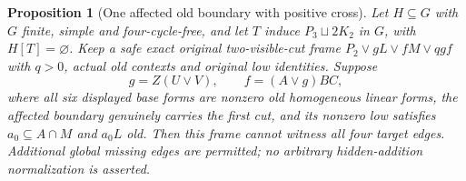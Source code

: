 \documentclass[11pt]{article}
\newtheorem{proposition}[theorem]{Proposition}
\theoremstyle{definition}
\theoremstyle{remark}
\begin{document}
\begin{proposition}[One affected old boundary with positive cross]\label{prop:pathsingleaffectedpositive}
Let $H\subseteq G$ with $G$ finite, simple and four-cycle-free, and let $T$ induce $P_3\sqcup2K_2$ in $G$, with $H[T]=\varnothing$. Keep a safe exact original two-visible-cut frame $P_2\vee gL\vee fM\vee qgf$ with $q>0$, actual old contexts and original low identities. Suppose
\[
 g=Z(U\vee V),\qquad f=(A\vee g)BC,
\]
where all six displayed base forms are nonzero old homogeneous linear forms, the affected boundary genuinely carries the first cut, and its nonzero low satisfies $a_0\subseteq A\cap M$ and $a_0L$ old. Then this frame cannot witness all four target edges. Additional global missing edges are permitted; no arbitrary hidden-addition normalization is asserted.
\end{proposition}
\end{document}
